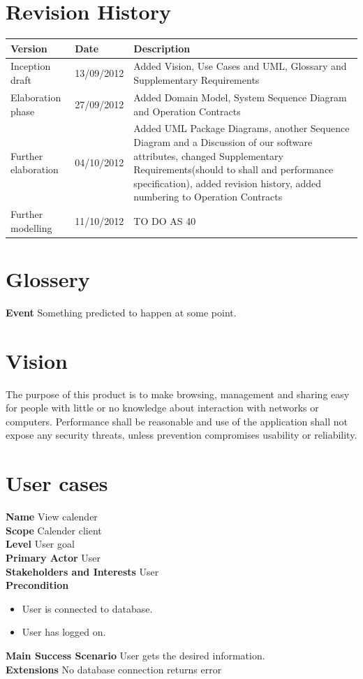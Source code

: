 \documentclass[a4paper,10pt,titlepage]{article}
\begin{document}
\section{Revision History}

\begin{center}
    \begin{tabular}{ | l | l | p{7cm}  | }
    \hline
    Version & Date & Description \\ \hline
    Inception draft & 13/09/2012 & Added Vision, Use Cases and UML, Glossary and Supplementary Requirements	\\ \hline
    Elaboration phase & 27/09/2012 & Added Domain Model, System Sequence Diagram and Operation Contracts\\ \hline
    Further elaboration & 04/10/2012 & Added UML Package Diagrams, another Sequence Diagram and a Discussion of our software attributes, changed Supplementary Requirements(should to shall and performance specification), added revision history, added numbering to Operation Contracts \\ \hline
    Further modelling & 11/10/2012 & TO DO AS 40	\\ \hline
    \end{tabular}
\end{center}

\section{Glossery}
	\textbf{Event}
	Something predicted to happen at some point.
	
\section{Vision}
	The purpose of this product is to make browsing, management and sharing easy for people with little or no knowledge about interaction with networks or computers. Performance shall be reasonable and use of the application shall not expose any security threats, unless prevention compromises usability or reliability.
	
\section{User cases}
	\textbf{Name}
	View calender
	\\
	\textbf{Scope}
	Calender client
	\\
	\textbf{Level}
	User goal
	\\
	\textbf{Primary Actor}
	User
	\\
	\textbf{Stakeholders and Interests}
	User
	\\
	\textbf{Precondition}
		\begin{itemize}
		\item User is connected to database.
		\item User has logged on.
		\\
		\end{itemize}
	\textbf{Main Success Scenario}
	User gets the desired information.
	\\
	\textbf{Extensions}
	No database connection returns error
	\\
	
\end{document}
